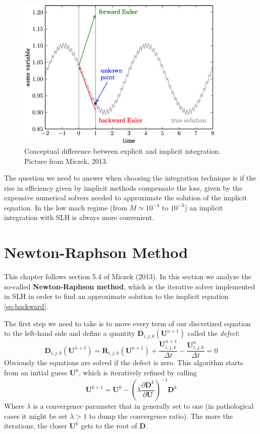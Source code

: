 \begin{figure}[t]
\centering
\includegraphics[width=10cm]{./img/implicit}
\caption{Conceptual difference between explicit and implicit integration. Picture from Miczek, 2013.}
\label{fig:implicit}
\centering
\end{figure}
The question we need to answer when choosing the integration technique is if the rise in efficiency given by implicit methods compensate the loss, given by the expensive numerical solvers needed to approximate the solution of the implicit equation. In the low mach regime (from $M \simeq 10^{-4}$ to $10^{-3}$) an implicit integration with SLH is always more convenient. 

\section{Newton-Raphson Method}
This chapter follows section 5.4 of Miczek (2013).
In this section we analyze the so-called \textbf{Newton-Raphson method}, which is the iterative solver implemented in SLH in order to find an approximate solution to the implicit equation \ref{eq:backward}. 

The first step we need to take is to move every term of our discretized equation to the left-hand side and define a quantity $\mathbf{D}_{i, j, k}(\mathbf{U}^{n+1})$ called the \textit{defect}:
\begin{equation}\label{eq:defect}
	\mathbf{D}_{i, j, k}(\mathbf{U}^{n+1}) = \mathbf{R}_{i, j, k}(\mathbf{U}^{n+1}) + \frac{\mathbf{U}_{i, j, k}^{n+1}}{\Delta t} - \frac{\mathbf{U}^n_{i, j, k}}{\Delta t} = 0
\end{equation}
Obviously the equations are solved if the defect is zero. This algorithm starts from an initial guess $\mathbf{U}^0$, which is iteratively refined by calling
\begin{equation}\label{eq:newtonraphson}
	\mathbf{U}^{k+1} = \mathbf{U}^k - \left( \lambda \frac{\partial \mathbf{D}^k}{\partial \mathbf{U}}  \right)^{-1} \mathbf{D}^k
\end{equation}
Where $\lambda$ is a convergence parameter that in generally set to one (in pathological cases it might be set $\lambda > 1$ to dump the convergence ratio). The more the iterations, the closer $\mathbf{U}^k$ gets to the root of $\mathbf{D}$.

